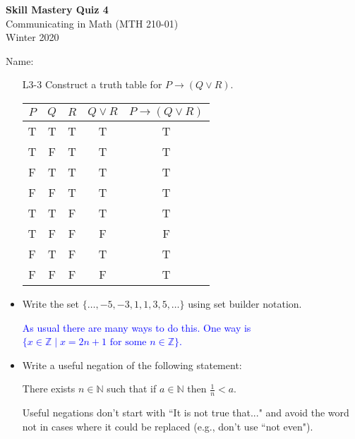 \documentclass[10pt]{article}
\newcommand{\Z}{\mathbb{Z}}
\newcommand{\N}{\mathbb{N}}
\newcommand{\bs}{\begin{solution}}
\begin{document}
\vspace{-1.2in}
\begin{center} \textbf{\Large{Skill Mastery Quiz 4}} \\
Communicating in Math (MTH 210-01)\\
Winter 2020
\end{center}



\noindent Name: 




\begin{itemize}
	
\item[L3-3] Construct a truth table for $P \rightarrow (Q\vee R)$.

\bs
\begin{center}
\begin{tabular}{c|c|c|c|c}
$P$ &$Q$ &$R$ &$Q\vee R$ &$P\rightarrow (Q\vee R)$\\
\hline
T &T &T  &T &T \\
T &F &T  &T &T \\
F &T &T  &T &T \\
F &F &T  &T &T \\
T &T &F &T&T \\
T &F &F &F&F \\
F &T &F &T &T \\
F &F &F &F &T\\
\end{tabular}
\end{center}
\end{solution}
\vfill
\vfill
\vfill


\item[L4-3]  Write the set $\{\dots, -5,-3,1,1,3,5,\dots\}$ using set builder notation.

\bs \textcolor{blue}{As usual there are many ways to do this. One way is $\{x\in\Z \mid x=2n+1 \text{ for some } n\in\Z\}$.}
\end{solution}

\vfill

\newpage

\item[L5-2] Write a useful negation of the following statement:
		\begin{center}
		There exists $n\in\N$ such that if $a\in\N$ then $\frac{1}{n}<a$.
		\end{center}
		Useful negations don't start with ``It is not true that..." and avoid the word not in cases where it could be replaced (e.g., don't use ``not even").


\end{itemize}
\end{document}

